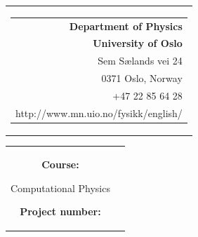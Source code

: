 


% 
{}
\thispagestyle{empty}
\begin{nopagebreak}
{\samepage 
\begin{tabular}{r}
\parbox{\textwidth}{  
\hfill \parbox{5.5cm}{\begin{tabular}{r} %
{\small \textbf{Department of Physics}}\\
{\small  \textbf{University of Oslo}} \\
{\small  Sem S\ae lands vei 24} \\
{\small  0371 Oslo, Norway} \\
{\small +47 22 85 64 28} \\
{\small http://www.mn.uio.no/fysikk/english/}
\end{tabular}}}

\end{tabular}

\vspace{2.5cm}
\begin{tabular}{cc}
\parbox{20cm}{
\begin{description}
\item { \textbf{Course:}}

	Computational Physics\\
	\hspace{4cm}
	\vspace{0.7cm}
\item { \textbf{Project number:}}


\end{description}}
\end{tabular}}
\end{nopagebreak}
